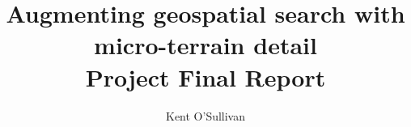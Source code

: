 \documentclass[sigconf]{acmart}
\begin{document}

\renewcommand{\shortauthors}{O'Sullivan}

\graphicspath{ {figures/}{auto_commit_fig/}{auto_fig/} }

\newcommand{\latexfile}[1]{}





\title{Augmenting geospatial search with micro-terrain detail\\ \Large Project Final Report}

\author{Kent O'Sullivan}

\begin{abstract}
\latexfile{00_Abstract.tex}
\end{abstract}

\maketitle


\latexfile{10_Introduction.tex}
\clearpage
\latexfile{20_Datasets.tex}
\clearpage
\latexfile{30_Architecture.tex}
\clearpage
\latexfile{40_Implementation.tex}
\clearpage
\latexfile{50_Results.tex}
\clearpage
\latexfile{60_Related.tex}
\clearpage
\latexfile{70_Limitations.tex}
\clearpage
\latexfile{80_Conclusion.tex}


 \label{bibliography}
\end{document}
